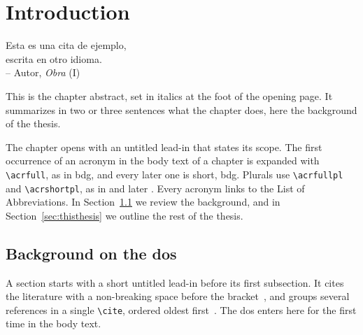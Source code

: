 \documentclass[../main]{subfiles}
\begin{document}
\chapter{Introduction}
\label{ch:ch1}
\begin{otherlanguage}{spanish}
\begin{chquote}
Esta es una cita de ejemplo,  \\
escrita en otro idioma.  \\
\bigskip
-- Autor, \textit{Obra} (I)
\end{chquote}
\end{otherlanguage}

\begin{chabstract}
This is the chapter abstract, set in italics at the foot of the opening page.
It summarizes in two or three sentences what the chapter does, here the background of the thesis.
\end{chabstract}

\clearpage

The chapter opens with an untitled lead-in that states its scope.
The first occurrence of an acronym in the body text of a chapter is expanded with \verb|\acrfull|, as in \acrfull{bdg}, and every later one is short, \acrshort{bdg}.
Plurals use \verb|\acrfullpl| and \verb|\acrshortpl|, as in  and later .
Every acronym links to the List of Abbreviations.
\lipsum[1][1-4]
In Section~\ref{sec:background} we review the background, and in Section~\ref{sec:thisthesis} we outline the rest of the thesis.

\section{Background on the \acrlong{dos}}
\label{sec:background}
A section starts with a short untitled lead-in before its first subsection.
It cites the literature with a non-breaking space before the bracket~\cite{Brown:PRB19}, and groups several references in a single \verb|\cite|, ordered oldest first~\cite{Muller:96, Brown:PRB19, Smith:PRL20}.
The \acrfull{dos} enters here for the first time in the body text.
\lipsum[2][1-5]
\end{document}

